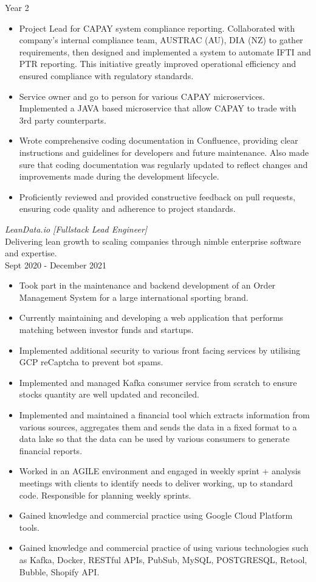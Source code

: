 \documentclass[10pt, a4paper]{cv}
\begin{document}
\begin{paracol}{2}
\begin{flushleft}
		\quad Year 2
		\begin{itemize}[ topsep=0pt]  \itemsep -2pt
			\item Project Lead for CAPAY system compliance reporting. Collaborated with company's internal compliance team, AUSTRAC (AU), DIA (NZ) to gather requirements, then designed and implemented a system to automate IFTI and PTR reporting.  This initiative greatly improved operational efficiency and ensured compliance with regulatory standards.
			\item Service owner and go to person for various CAPAY microservices. Implemented a JAVA based microservice that allow CAPAY to trade with 3rd party counterparts.
			\item Wrote comprehensive coding documentation in Confluence, providing clear instructions and guidelines for developers and future maintenance. Also made sure that coding documentation was regularly updated to reflect changes and improvements made during the development lifecycle.
			\item Proficiently reviewed and provided constructive feedback on pull requests, ensuring code quality and adherence to project standards.
		\end{itemize}
		\switchcolumn
		\vspace{43pt}
		{\sl LeanData.io [Fullstack Lead Engineer] } \\
		Delivering lean growth to scaling companies through nimble enterprise software and expertise.\\
		Sept 2020 - December 2021
		\begin{itemize} \itemsep -2pt
			\item Took part in the maintenance and backend development of an Order Management System for a large international sporting brand.
			\item Currently maintaining and developing a web application that performs matching between investor funds and startups.
			\item Implemented additional security to various front facing services by utilising GCP reCaptcha to prevent bot spams.
			\item  Implemented and managed Kafka consumer service from scratch to ensure stocks quantity are well updated and reconciled.
			\item Implemented and maintained a financial tool which extracts information from various sources, aggregates them and sends the data in a fixed format to a data lake so that the data can be used by various consumers to generate financial reports.
			\item Worked in an AGILE environment and engaged in weekly sprint + analysis meetings with clients to identify needs to deliver working, up to standard code. Responsible for planning weekly sprints.
			\item Gained knowledge and commercial practice using Google Cloud Platform tools.
			\item Gained knowledge and commercial practice of using various technologies such as Kafka, Docker, RESTful APIs, PubSub, MySQL, POSTGRESQL, Retool, Bubble, Shopify API.
		\end{itemize}


\end{flushleft}
\end{paracol}
\end{document}
